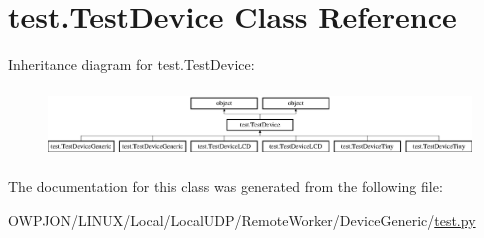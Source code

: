 \hypertarget{classtest_1_1TestDevice}{\section{test.\-Test\-Device Class Reference}
\label{classtest_1_1TestDevice}
}
Inheritance diagram for test.\-Test\-Device\-:\begin{figure}[H]
\begin{center}
\leavevmode
\includegraphics[height=1.854305cm]{classtest_1_1TestDevice}
\end{center}
\end{figure}


The documentation for this class was generated from the following file\-:\begin{DoxyCompactItemize}
\item 
O\-W\-P\-J\-O\-N/\-L\-I\-N\-U\-X/\-Local/\-Local\-U\-D\-P/\-Remote\-Worker/\-Device\-Generic/\hyperlink{LINUX_2Local_2LocalUDP_2RemoteWorker_2DeviceGeneric_2test_8py}{test.\-py}\end{DoxyCompactItemize}
